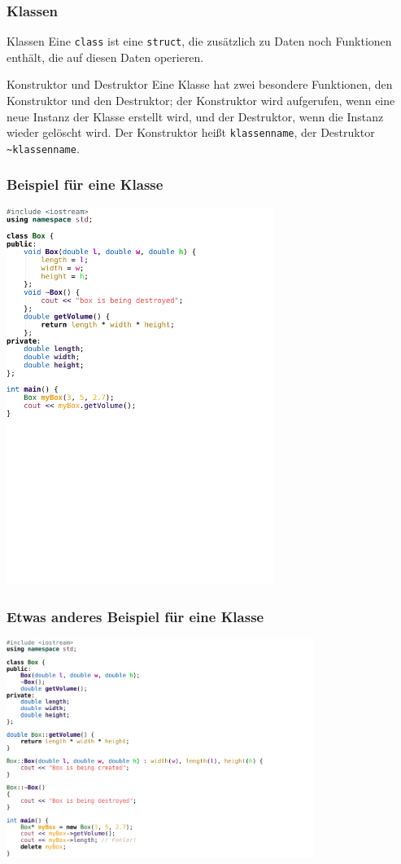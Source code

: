 \begin{frame}
    \frametitle{Klassen}
    \begin{block}{Klassen}
    Eine \texttt{class} ist eine \texttt{struct}, die zusätzlich zu Daten noch Funktionen enthält, die auf diesen Daten operieren.
    \end{block}
    \begin{block}{Konstruktor und Destruktor}
    Eine Klasse hat zwei besondere Funktionen, den Konstruktor und den Destruktor; der Konstruktor wird aufgerufen, wenn eine neue Instanz der Klasse erstellt wird, und der Destruktor, wenn die Instanz wieder gelöscht wird. Der Konstruktor heißt \texttt{klassenname}, der Destruktor \texttt{\~{}klassenname}.
    \end{block}
\end{frame}
\begin{frame}
    \frametitle{Beispiel für eine Klasse}
    \vspace{0.7cm}
    \includegraphics[width=8.7cm]{example_code/box2.pdf}
\end{frame}
\begin{frame}
    \frametitle{Etwas anderes Beispiel für eine Klasse}
    \includegraphics[width=10.0cm]{example_code/box3.pdf}
\end{frame}

